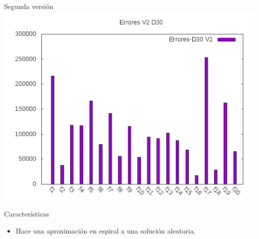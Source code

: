 \documentclass[10pt]{beamer}
\begin{document}
\begin{frame}[fragile]{Segunda versión}
		\includegraphics[scale=0.25]{./Imagenes/Errores/errores_v2_d30.png}
		
		\begin{block}{Características}
			\begin{itemize}
				\item Hace una aproximación en espiral a una solución aleatoria.
			\end{itemize}
		\end{block}
	\end{frame}
\end{document}
